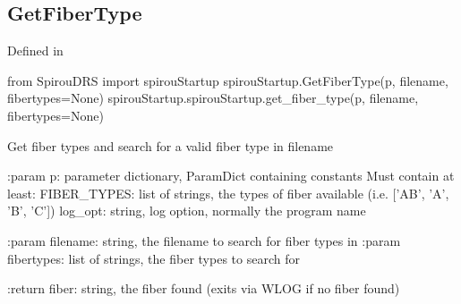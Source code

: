 \noindent\begin{minipage}{\textwidth}
\subsection{GetFiberType}

Defined in \spirouStartup{}

\begin{pythonbox}
from SpirouDRS import spirouStartup
spirouStartup.GetFiberType(p, filename, fibertypes=None)
spirouStartup.spirouStartup.get_fiber_type(p, filename, fibertypes=None)
\end{pythonbox}

\begin{pythondocstring}
Get fiber types and search for a valid fiber type in filename

:param p: parameter dictionary, ParamDict containing constants
    Must contain at least:
            FIBER_TYPES: list of strings, the types of fiber available
                         (i.e. ['AB', 'A', 'B', 'C'])
            log_opt: string, log option, normally the program name

:param filename: string, the filename to search for fiber types in
:param fibertypes: list of strings, the fiber types to search for

:return fiber: string, the fiber found (exits via WLOG if no fiber found)
\end{pythondocstring}
\end{minipage}


